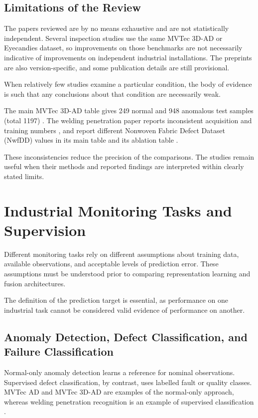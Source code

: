 \subsection{Limitations of the Review}

The papers reviewed are by no means exhaustive and are not statistically independent. Several
inspection studies use the same MVTec 3D-AD or Eyecandies dataset, so improvements on those
benchmarks are not necessarily indicative of improvements on independent industrial installations.
The preprints are also version-specific, and some publication details are still provisional.

When relatively few studies examine a particular condition, the body of evidence is such that any
conclusions about that condition are necessarily weak.

The main MVTec 3D-AD table gives 249 normal and 948 anomalous test samples (total 1197)
\parencite[Table~1]{Bergmann2022The}. The welding penetration paper reports inconsistent acquisition and
training numbers \parencite[pp.~6708, 6711]{Hua2026Weld}, and \textcite{P035} report different Nonwoven Fabric Defect Dataset (NwfDD) values in its main table
and its ablation table \parencite[Tables~IV, VI--VII]{P035}.

These inconsistencies reduce the precision of the comparisons. The studies remain useful when their
methods and reported findings are interpreted within clearly stated limits.

\section{Industrial Monitoring Tasks and Supervision}

Different monitoring tasks rely on different assumptions about training data, available
observations, and acceptable levels of prediction error. These assumptions must be understood prior
to comparing representation learning and fusion architectures.

The definition of the prediction target is essential, as performance on one industrial task
cannot be considered valid evidence of performance on another.

\subsection{Anomaly Detection, Defect Classification, and Failure Classification}

Normal-only anomaly detection learns a reference for nominal observations. Supervised defect
classification, by contrast, uses labelled fault or quality classes. MVTec AD and MVTec 3D-AD are
examples of the normal-only approach, whereas welding penetration recognition is an example of
supervised classification \parencite{Bergmann2019MVTec,Bergmann2022The,Hua2026Weld}.


